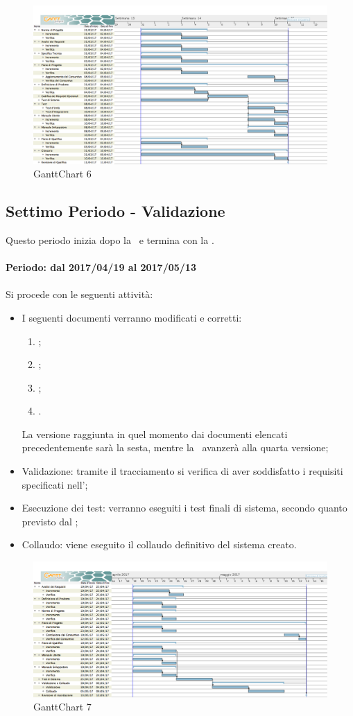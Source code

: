 \documentclass[../PianoDiProgetto.tex]{subfiles}
\begin{document}
	\begin{figure}[!h]
		\centering
		\includegraphics[width=\textwidth]{Pianificazione/Immagini/GanttChart06.png}
		\caption{GanttChart 6}
	\end{figure}	
	
	\subsection{Settimo Periodo - Validazione}
	Questo periodo inizia dopo la \revisionediqualifica\ e termina con la \revisionediaccettazione.
	\\
	\\
	\textbf{Periodo: dal 2017/04/19 al 2017/05/13}
	\\
	\\
	Si procede con le seguenti attività:
	\begin{itemize}
		\item I seguenti documenti verranno modificati e corretti:
			\begin{enumerate}
				\item \normediprogetto;
				\item \analisideirequisiti;
				\item \pianodiqualifica;
				\item \pianodiprogetto.
			\end{enumerate}
		La versione raggiunta in quel momento dai documenti elencati precedentemente sarà la sesta, mentre la \ avanzerà alla quarta versione;
		\item Validazione: tramite il tracciamento si verifica di aver soddisfatto i requisiti specificati nell'\analisideirequisiti;
		\item Esecuzione dei test: verranno eseguiti i test finali di sistema, secondo quanto previsto dal \pianodiqualifica;
		\item Collaudo: viene eseguito il collaudo definitivo del sistema creato.
	\end{itemize}
	
	\begin{figure}[!h]
		\centering
		\includegraphics[width=\textwidth]{Pianificazione/Immagini/GanttChart07.png}
		\caption{GanttChart 7}
	\end{figure}	
	
\end{document}
